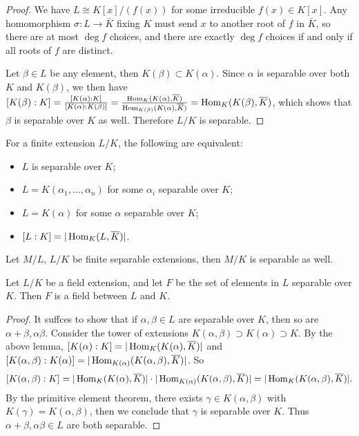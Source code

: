 \documentclass[11pt]{amsart}
\begin{document}
\begin{proof}
We have $L \cong K[x]/(f(x))$ for some irreducible $f(x) \in K[x]$. Any homomorphism $\sigma: L \to \bar{K}$ fixing $K$ must send $x$ to another root of $f$ in $\bar{K}$, so there are at most $\deg f$ choices, and there are exactly $\deg f$ choices if and only if all roots of $f$ are distinct.

Let $\beta\in L$ be any element, then $K(\beta)\subset K(\alpha)$. Since $\alpha$ is separable over both $K$ and $K(\beta)$, we then have $[K(\beta):K] = \frac{[K(\alpha):K]}{[K(\alpha):K(\beta)]} = \frac{\operatorname{Hom}_K(K(\alpha), \overline{K})}{\operatorname{Hom}_{K(\beta)}(K(\alpha), \overline{K})} = \operatorname{Hom}_K(K(\beta),\overline{K})$, which shows that $\beta$ is separable over $K$ as well. Therefore $L/K$ is separable.
\end{proof}

\begin{prop}
For a finite extension $L/K$, the following are equivalent:
\begin{itemize}
    \item $L$ is separable over $K$;
    \item $L = K(\alpha_1,\dots,\alpha_n)$ for some $\alpha_i$ separable over $K$;
    \item $L = K(\alpha)$ for some $\alpha$ separable over $K$;
    \item $[L:K] = |\operatorname{Hom}_K(L, \overline{K})|$.
\end{itemize}
\end{prop}

\begin{cor}
Let $M/L$, $L/K$ be finite separable extensions, then $M/K$ is separable as well.
\end{cor}

\begin{lem}
Let $L/K$ be a field extension, and let $F$ be the set of elements in $L$ separable over $K$. Then $F$ is a field between $L$ and $K$.
\end{lem}

\begin{proof}
It suffces to show that if $\alpha, \beta \in L$ are separable over $K$, then so are $\alpha + \beta, \alpha\beta$. Consider the tower of extensions
$K(\alpha, \beta) \supset K(\alpha) \supset K$.
By the above lemma, $[K(\alpha):K] = |\operatorname{Hom}_K(K(\alpha), \overline{K})|$ and $[K(\alpha,\beta):K(\alpha)] = |\operatorname{Hom}_{K(\alpha)}(K(\alpha,\beta), \overline{K})|$. So 
\[[K(\alpha,\beta):K] = |\operatorname{Hom}_K(K(\alpha), \overline{K})|\cdot |\operatorname{Hom}_{K(\alpha)}(K(\alpha,\beta), \overline{K})| = |\operatorname{Hom}_K(K(\alpha, \beta), \overline{K})|.\] 
By the primitive element theorem, there exists $\gamma \in K(\alpha,\beta)$ with $K(\gamma) = K(\alpha,\beta)$, then we conclude that $\gamma$ is separable over $K$. Thus $\alpha+\beta, \alpha\beta \in L$ are both separable.
\end{proof}
\end{document}
